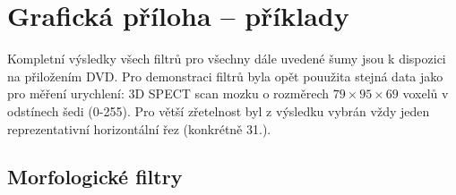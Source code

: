 \chapter{Grafická příloha -- příklady}\label{příloha obrázky}

    Kompletní výsledky všech filtrů pro všechny dále uvedené šumy jsou k dispozici na přiložením DVD. Pro demonstraci filtrů byla opět pouužita stejná data jako pro měření urychlení: 3D SPECT scan mozku o rozměrech $79 \times 95 \times 69$ voxelů v odstínech šedi (0-255). Pro větší zřetelnost byl z výsledku vybrán vždy jeden reprezentativní horizontální řez (konkrétně 31.).

    \section{Morfologické filtry}

